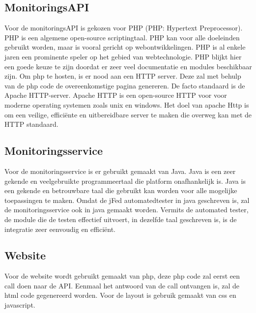 \subsection{MonitoringsAPI}
\npar
{}
Voor de monitoringsAPI is gekozen voor PHP (PHP: Hypertext Preprocessor). PHP is een algemene open-source scriptingtaal. PHP kan voor alle doeleinden gebruikt worden, maar is vooral gericht op webontwikkelingen\citep{php-about}. PHP is al enkele jaren een prominente speler op het gebied van webtechnologie. PHP blijkt hier een goede keuze te zijn doordat er zeer veel documentatie en modules beschikbaar zijn.
\clearpage
\npar
{}
Om php te hosten, is er nood aan een HTTP server. Deze zal met behulp van de php code de overeenkomstige pagina genereren. De facto standaard is de Apache HTTP-server. Apache HTTP is een open-source HTTP voor voor moderne operating systemen zoals unix en windows\citep{apache-about}. Het doel van apache Http is om een veilige, effici\"ente en uitbereidbare server te maken die overweg kan met de HTTP standaard.
\subsection{Monitoringsservice}
\npar
{}
Voor de monitoringsservice is er gebruikt gemaakt van Java. Java is een zeer gekende en veelgebruikte programmeertaal die platform onafhankelijk is\citep{java-about}. Java is een gekende en betrouwbare taal die gebruikt kan worden voor alle mogelijke toepassingen te maken. Omdat de jFed automatedtester in java geschreven is, zal de monitoringsservice ook in java gemaakt worden. Vermits de automated tester, de module die de testen effectief uitvoert, in dezelfde taal geschreven is, is de integratie zeer eenvoudig en effici\"ent.
\subsection{Website}

Voor de website wordt gebruikt gemaakt van php, deze php code zal eerst een call doen naar de API. Eenmaal het antwoord van de call ontvangen is, zal de html code gegenereerd worden. Voor de layout is gebruik gemaakt van css en javascript.
